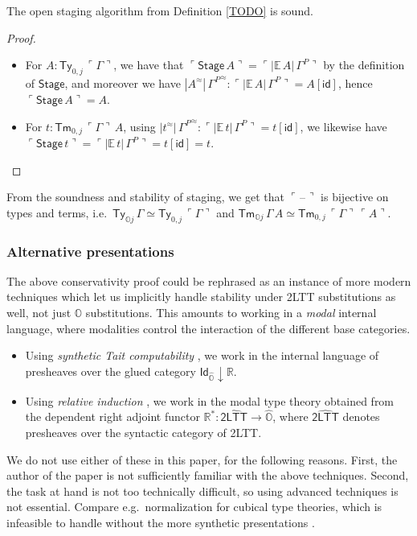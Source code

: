 \documentclass[acmsmall]{acmart}
\newcommand{\msf}[1]{\mathsf{#1}}
\newcommand{\mbb}[1]{\mathbb{#1}}
\newcommand{\wh}[1]{\widehat{#1}}
\newcommand{\mbbo}{\mbb{O}}
\newcommand{\Ty}{\msf{Ty}}
\newcommand{\Tm}{\msf{Tm}}
\newcommand{\id}{\msf{id}}
\newcommand{\blank}{{\mathord{\hspace{1pt}\text{--}\hspace{1pt}}}}
\newcommand{\emb}[1]{\ulcorner#1\urcorner}
\newcommand{\Stage}{\msf{Stage}}
\newcommand{\hato}{\bm\hat{\mbbo}}
\newcommand{\ev}{\mbb{E}}
\newcommand{\re}{\mbb{R}}
\theoremstyle{remark}
\newcommand{\rel}{^{\approx}}
\begin{document}
\begin{theorem} The open staging algorithm from Definition \ref{TODO} is sound.
\end{theorem}
\begin{proof}
\mbox{}
\begin{itemize}
\item For $A : \Ty_{0,j}\,\emb{\Gamma}$, we have that $\emb{\Stage\,A} =
\emb{|\ev\,A|\,\Gamma^P}$ by the definition of $\Stage$, and moreover we have
$|A\rel|\,{\Gamma^P}\rel : \emb{|\ev\,A|\,\Gamma^P} = A[\id]$, hence $\emb{\Stage\,A} = A$.

\item For $t : \Tm_{0,j}\,\emb{\Gamma}\,A$, using $|t\rel|\,{\Gamma^P}\rel : \emb{|\ev\,t|\,\Gamma^P} = t[\id]$, we likewise
  have $\emb{\Stage\,t} = \emb{|\ev\,t|\,\Gamma^P} = t[\id] = t$.
\end{itemize}
\end{proof}

\begin{corollary}
From the soundness and stability of staging, we get that $\emb{\blank}$ is
bijective on types and terms, i.e.\ $\Ty_{\mbbo j}\,\Gamma \simeq \Ty_{0,j}\,\emb{\Gamma}$ and
$\Tm_{\mbbo j}\,\Gamma\,A \simeq \Tm_{0,j}\,\emb{\Gamma}\,\emb{A}$.
\end{corollary}

\subsubsection{Alternative presentations}
The above conservativity proof could be rephrased as an instance of more modern
techniques which let us implicitly handle stability under 2LTT substitutions as
well, not just $\mbbo$ substitutions. This amounts to working in a \emph{modal}
internal language, where modalities control the interaction of the different base
categories.
\begin{itemize}
\item Using \emph{synthetic Tait computability} \cite{TODO}, we work in the internal language
      of presheaves over the glued category $\msf{Id}_{\hato}\downarrow \re$.
\item Using \emph{relative induction} \cite{TODO}, we work in the modal type theory
      obtained from the dependent right adjoint functor $\re^* : \wh{\msf{2LTT}} \to \hato$,
      where $\wh{\msf{2LTT}}$ denotes presheaves over the syntactic category of 2LTT.
\end{itemize}
We do not use either of these in this paper, for the following reasons. First,
the author of the paper is not sufficiently familiar with the above
techniques. Second, the task at hand is not too technically difficult, so using
advanced techniques is not essential. Compare e.g.\ normalization for cubical
type theories, which is infeasible to handle without the more synthetic
presentations \cite{TODO}.
\end{document}
